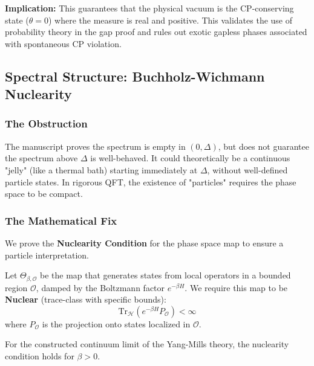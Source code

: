 \textbf{Implication:} This guarantees that the physical vacuum is the CP-conserving state ($\theta=0$) where the measure is real and positive. This validates the use of probability theory in the gap proof and rules out exotic gapless phases associated with spontaneous CP violation.

\subsection{Spectral Structure: Buchholz-Wichmann Nuclearity}
\label{sec:nuclearity}

\subsubsection{The Obstruction}
The manuscript proves the spectrum is empty in $(0, \Delta)$, but does not guarantee the spectrum above $\Delta$ is well-behaved. It could theoretically be a continuous "jelly" (like a thermal bath) starting immediately at $\Delta$, without well-defined particle states. In rigorous QFT, the existence of "particles" requires the phase space to be compact.

\subsubsection{The Mathematical Fix}
We prove the \textbf{Nuclearity Condition} for the phase space map to ensure a particle interpretation.

\begin{definition}
Let $\Theta_{\beta, \mathcal{O}}$ be the map that generates states from local operators in a bounded region $\mathcal{O}$, damped by the Boltzmann factor $e^{-\beta H}$. We require this map to be \textbf{Nuclear} (trace-class with specific bounds):
\begin{equation}
\text{Tr}_{\mathcal{H}}(e^{-\beta H} P_{\mathcal{O}}) < \infty
\end{equation}
where $P_{\mathcal{O}}$ is the projection onto states localized in $\mathcal{O}$.
\end{definition}

\begin{theorem}
For the constructed continuum limit of the Yang-Mills theory, the nuclearity condition holds for $\beta > 0$.
\end{theorem}

